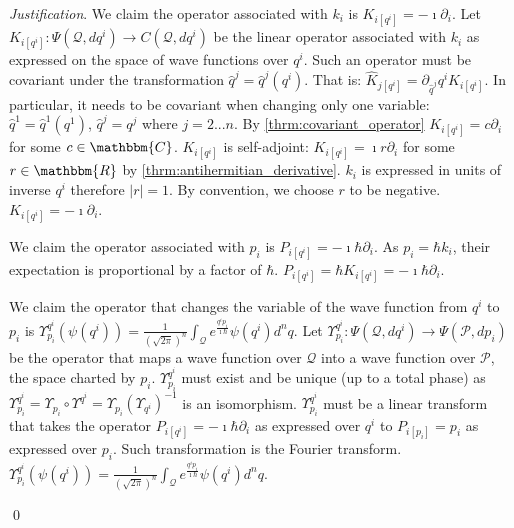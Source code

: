 \documentclass[aps,pra,10pt,twocolumn,floatfix,nofootinbib]{revtex4-1}
\numberwithin{equation}{section}
\theoremstyle{definition}
\newenvironment{justification}{\emph{Justification}.}{\qed}
\begin{document}
\begin{justification}
	We claim the operator associated with $k_i$ is $K_{i [q^i]} = - \imath \partial_{i}$. Let $K_{i [q^i]} : \Psi(\mathcal{Q}, dq^i) \rightarrow C(\mathcal{Q}, dq^i)$ be the linear operator associated with $k_i$ as expressed on the space of wave functions over $q^i$. Such an operator must be covariant under the transformation $\hat{q}^j = \hat{q}^j(q^i)$. That is: $\hat{K}_{j [q^i]} = \partial_{\hat{q}^j}q^iK_{i [q^i]}$. In particular, it needs to be covariant when changing only one variable: $\hat{q}^1 = \hat{q}^1(q^1)$, $\hat{q}^j = q^j$ where $j=2...n$. By \ref{thrm:covariant_operator} $K_{i [q^i]}=c\partial_i$ for some $c \in \mathbbm{C}$. $K_{i [q^i]}$ is self-adjoint: $K_{i  [q^i]}=\imath r\partial_i$ for some $r \in \mathbbm{R}$ by \ref{thrm:antihermitian_derivative}. $k_i$ is expressed in units of inverse $q^i$ therefore $|r|=1$. By convention, we choose $r$ to be negative. $K_{i [q^i]} = - \imath \partial_{i}$.
	
	We claim the operator associated with $p_i$ is $P_{i [q^i]} = - \imath \hbar \partial_{i}$. As $p_i=\hbar k_i$, their expectation is proportional by a factor of $\hbar$. $P_{i [q^i]}=\hbar K_{i [q^i]}= -\imath \hbar \partial_i$.
	
	We claim the operator that changes the variable of the wave function from $q^i$ to $p_i$ is $\Upsilon^{q^i}_{p_i} (\psi(q^i)) = \frac{1}{(\sqrt{2\pi})^n} \int_{\mathcal{Q}} e^{\frac{q^i p_i }{\imath \hbar}} \psi(q^i) d^n q $. Let $\Upsilon^{q^i}_{p_i} : \Psi(\mathcal{Q}, dq^i) \rightarrow \Psi(\mathcal{P}, dp_i)$ be the operator that maps a wave function over $\mathcal{Q}$ into a wave function over $\mathcal{P}$, the space charted by $p_i$. $\Upsilon^{q^i}_{p_i}$ must exist and be unique (up to a total phase) as $\Upsilon^{q^i}_{p_i} = \Upsilon_{p_i}\circ\Upsilon^{q^i} = \Upsilon_{p_i}(\Upsilon_{q^i})^{-1}$ is an isomorphism. $\Upsilon^{q^i}_{p_i}$ must be a linear transform that takes the operator $P_{i [q^i]}= - \imath \hbar \partial_i$ as expressed over $q^i$ to $P_{i [p_i]} = p_i$ as expressed over $p_i$. Such transformation is the Fourier transform. $\Upsilon^{q^i}_{p_i} (\psi(q^i)) = \frac{1}{(\sqrt{2\pi})^n} \int_{\mathcal{Q}} e^{\frac{q^i p_i }{\imath \hbar}} \psi(q^i) d^n q $.
	

\end{justification}
\end{document}
